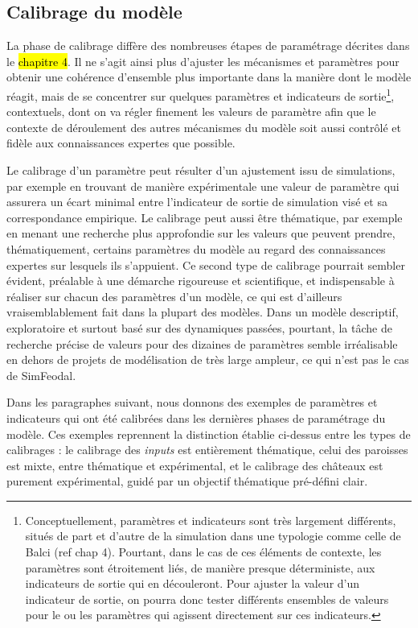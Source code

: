 \subsection{Calibrage du modèle}

La phase de calibrage diffère des nombreuses étapes de paramétrage décrites dans le \hl{chapitre 4}.
Il  ne s'agit ainsi plus d'ajuster les mécanismes et paramètres pour obtenir une cohérence d'ensemble plus importante dans la manière dont le modèle réagit, mais de se concentrer sur quelques paramètres et indicateurs de sortie\footnote{
Conceptuellement, paramètres et indicateurs sont très largement différents, situés de part et d'autre de la simulation dans une typologie comme celle de Balci (ref chap 4).
Pourtant, dans le cas de ces éléments de contexte, les paramètres sont étroitement liés, de manière presque déterministe, aux indicateurs de sortie qui en découleront.
Pour \og ajuster\fg{} la valeur d'un indicateur de sortie, on pourra donc tester différents ensembles de valeurs pour le ou les paramètres qui agissent directement sur ces indicateurs.
}, contextuels, dont on va régler finement les valeurs de paramètre afin que le contexte de déroulement des autres mécanismes du modèle soit aussi contrôlé et fidèle aux connaissances expertes que possible.

Le calibrage d'un paramètre peut résulter d'un ajustement issu de simulations, par exemple en trouvant de manière expérimentale une valeur de paramètre qui assurera un écart minimal entre l'indicateur de sortie de simulation visé et sa correspondance empirique.
Le calibrage peut aussi être thématique, par exemple en menant une recherche plus approfondie sur les valeurs que peuvent prendre, thématiquement, certains paramètres du modèle au regard des connaissances expertes sur lesquels ils s'appuient.
Ce second type de calibrage pourrait sembler évident, préalable à une démarche rigoureuse et scientifique, et indispensable à réaliser sur chacun des paramètres d'un modèle, ce qui est d'ailleurs vraisemblablement fait dans la plupart des modèles.
Dans un modèle descriptif, exploratoire et surtout basé sur des dynamiques passées, pourtant, la tâche de recherche précise de valeurs pour des dizaines de paramètres semble irréalisable en dehors de projets de modélisation de très large ampleur, ce qui n'est pas le cas de SimFeodal.

Dans les paragraphes suivant, nous donnons des exemples de paramètres et indicateurs qui ont été calibrées dans les dernières phases de paramétrage du modèle.
Ces exemples reprennent la distinction établie ci-dessus entre les types de calibrages : le calibrage des \textit{inputs} est entièrement thématique, celui des paroisses est mixte, entre thématique et expérimental, et le calibrage des châteaux est purement expérimental, guidé par un objectif thématique pré-défini clair.


